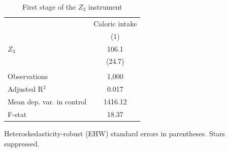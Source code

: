 
\begin{table}[htbp]
   \caption{\label{tab:fs_z3} First stage of the $Z_3$ instrument}
   \bigskip
   \centering
   \begin{tabular}{lc}
      \toprule
                                & Caloric intake \\   
                                & (1)\\  
      \midrule 
      $Z_3$                     & 106.1\\   
                                & (24.7)\\   
       \\
      Observations              & 1,000\\  
      Adjusted R$^2$            & 0.017\\  
      Mean dep. var. in control & 1416.12\\  
      F-stat                    & 18.37\\  
      \bottomrule
   \end{tabular}
   
   \par \raggedright 
   Heteroskedasticity-robust (EHW) standard errors in parentheses. Stars suppressed.
\end{table}


